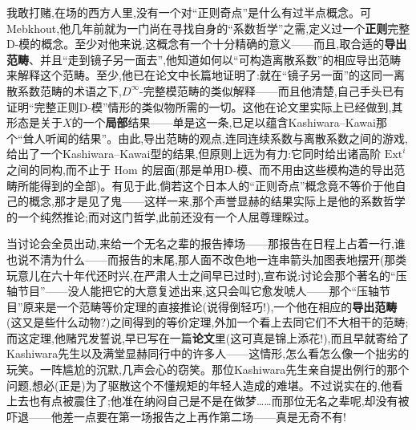 \noindent 我敢打赌,在场的西方人里,没有一个对“正则奇点”是什么有过半点概念。可Mebkhout,他几年前就为一门尚在寻找自身的“系数哲学”之需,定义过一个\textbf{正则}完整D-模的概念。至少对他来说,这概念有一个十分精确的意义——而且,取合适的\textbf{导出范畴}、并且“走到镜子另一面去”,他知道如何以“可构造离散系数”的相应导出范畴来解释这个范畴。至少,他已在论文中长篇地证明了:就在“镜子另一面”的这同一离散系数范畴的术语之下,$D^{\infty}$-完整模范畴的类似解释——而且他清楚,自己手头已有证明“完整正则D-模”情形的类似物所需的一切。这他在论文里实际上已经做到,其形态是关于$X$的一个\textbf{局部}结果——单是这一条,已足以蕴含Kashiwara--Kawai那个“耸人听闻的结果”。由此,导出范畴的观点,连同连续系数与离散系数之间的游戏,给出了一个Kashiwara--Kawai型的结果,但原则上远为有力:它同时给出诸高阶 $\mathrm{Ext}^{i}$ 之间的同构,而不止于 $\mathrm{Hom}$ 的层面(那是单用D-模、而不用由这些模构造的导出范畴所能得到的全部)。有见于此,倘若这个日本人的“正则奇点”概念竟不等价于他自己的概念,那才是见了鬼——这样一来,那个声誉显赫的结果实际上是他的系数哲学的一个纯然推论;而对这门哲学,此前还没有一个人屈尊理睬过。

\noindent 当讨论会全员出动,来给一个无名之辈的报告捧场——那报告在日程上占着一行,谁也说不清为什么——而报告的末尾,那人面不改色地一连串箭头加图表地摆开(那类玩意儿\dmark{}在六十年代还时兴,在严肃人士之间早已过时),宣布说:讨论会那个著名的“压轴节目”——没人能把它的大意复述出来,这只会叫它愈发唬人——那个“压轴节目”原来是一个范畴等价定理的直接推论(说得倒轻巧!),一个他在相应的\textbf{导出范畴}(这又是些什么动物?)之间得到的等价定理,外加一个看上去同它们不大相干的范畴;而这定理,他赌咒发誓说,早已写在一篇\textbf{论文}里(这可真是锦上添花!),而且早就寄给了Kashiwara先生以及满堂显赫同行中的许多人——这情形,怎么看怎么像一个拙劣的玩笑。一阵尴尬的沉默,几声会心的窃笑。那位Kashiwara先生亲自提出例行的那个问题,想必(正是)为了驱散这个不懂规矩的年轻人造成的难堪。不过说实在的,他看上去也有点被震住了;他准在纳闷自己是不是在做梦……而那位无名之辈呢,却没有被吓退——他差一点要在第一场报告之上再作第二场——真是无奇不有!

